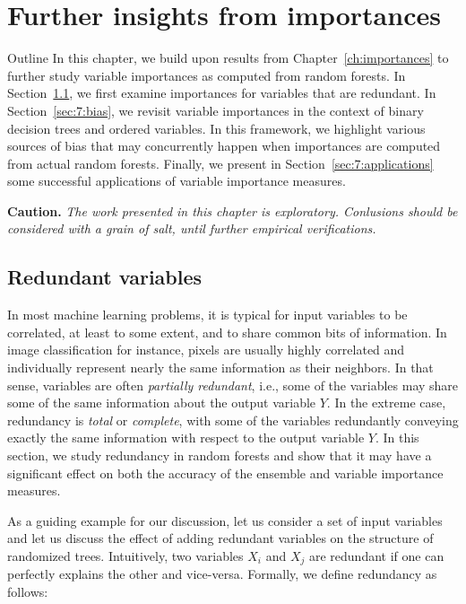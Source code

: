 \chapter{Further insights from importances}\label{ch:applications}

\begin{remark}{Outline}
In this chapter, we build upon results from Chapter~\ref{ch:importances} to
further study variable importances as computed from random forests. In
Section~\ref{sec:7:redundant}, we first examine importances for variables that
are redundant. In Section~\ref{sec:7:bias}, we revisit variable importances in
the context of binary decision trees and ordered variables. In this framework, we
highlight various sources of bias that may concurrently happen when
importances are computed from actual random forests. Finally, we present in
Section~\ref{sec:7:applications} some successful applications
of variable importance measures.
\end{remark}

\noindent\textbf{Caution.} \textit{The work presented in
this chapter is exploratory. Conlusions should be considered with a grain of salt, until
further empirical verifications.}

\section{Redundant variables}
\label{sec:7:redundant}

In most machine learning problems, it is typical for input variables to be
correlated, at least to some extent, and to share common bits of information.
In image classification for instance, pixels are usually highly correlated and
individually represent nearly the same information as their neighbors. In that
sense, variables are often \textit{partially redundant}, i.e., some of the
variables may share some of the same information about the output variable $Y$.
In the extreme case, redundancy is \textit{total}  or \textit{complete}, with
some of the variables redundantly conveying exactly the same information with
respect to the output variable $Y$. In this section, we study redundancy in
random forests and show that it may have a significant effect on both the
accuracy of the ensemble and variable importance measures.

As a guiding example for our discussion, let us consider a set of input
variables and let us discuss the effect of adding redundant variables on the
structure of randomized trees. Intuitively, two variables $X_i$ and $X_j$ are
redundant if one can perfectly explains the other and vice-versa. Formally, we
define redundancy as follows:

